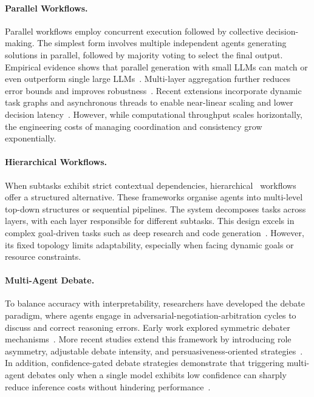 \documentclass[]{selfevolagent}
\theoremstyle{plain}
\theoremstyle{definition}
\theoremstyle{remark}
\begin{document}
\paragraph{Parallel Workflows.} Parallel workflows employ concurrent execution followed by collective decision-making. The simplest form involves multiple independent agents generating solutions in parallel, followed by majority voting to select the final output. Empirical evidence shows that parallel generation with small LLMs can match or even outperform single large LLMs~\citep{anonymous2024replacing, wang2025mixtureofagents}. Multi-layer aggregation further reduces error bounds and improves robustness~\citep{zhang2025optimizingsequentialmultisteptasks}. Recent extensions incorporate dynamic task graphs and asynchronous threads to enable near-linear scaling and lower decision latency~\citep{yu2025dyntaskmasdynamictaskgraphdriven,gu2025agentgroupchatv2divideandconquerllmbasedmultiagent,wang2025all}. However, while computational throughput scales horizontally, the engineering costs of managing coordination and consistency grow exponentially. 

\paragraph{Hierarchical Workflows.}
When subtasks exhibit strict contextual dependencies, hierarchical~\citep{zhang2024chain,qian2024chatdevcommunicativeagentssoftware} workflows offer a structured alternative. These frameworks organise agents into multi-level top-down structures or sequential pipelines. The system decomposes tasks across layers, with each layer responsible for different subtasks. This design excels in complex goal-driven tasks such as deep research and code generation~\citep{hong2023metagpt,zhang2025agentorchestrahierarchicalmultiagentframework}. However, its fixed topology limits adaptability, especially when facing dynamic goals or resource constraints.

\paragraph{Multi-Agent Debate.} 
To balance accuracy with interpretability, researchers have developed the debate paradigm, where agents engage in adversarial-negotiation-arbitration cycles to discuss and correct reasoning errors. Early work explored symmetric debater mechanisms~\citep{li2024improvingmultiagentdebatesparse}. %
More recent studies extend this framework by introducing role asymmetry, adjustable debate intensity, and persuasiveness-oriented strategies~\citep{yin-etal-2023-exchange,liang-etal-2024-encouraging,khan2024debating,chang2024socrasynthmultillmreasoningconditional}. In addition, confidence-gated debate strategies demonstrate that triggering multi-agent debates only when a single model exhibits low confidence can sharply reduce inference costs without hindering performance~\citep{eo2025debatenecessaryadaptivemultiagent}.
\end{document}
